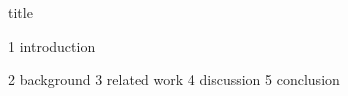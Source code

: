 \documentclass{article}
\begin{document}
{title}

\frontmatter

\tableofcontents


\mainmatter


{1 introduction}

{2 background}
{3 related work}
{4 discussion}
{5 conclusion}
\newpage



\end{document}
